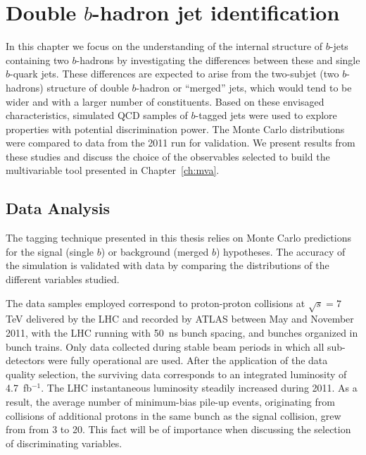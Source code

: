 \chapter{Double $b$-hadron jet identification}\label{ch:kinematic}

In this chapter we focus on the understanding of the internal structure of $b$-jets containing two $b$-hadrons by investigating the differences between these and single $b$-quark jets.  These differences %
are expected to arise from the two-subjet (two $b$-hadrons) structure of double $b$-hadron or ``merged'' jets, which would tend to be wider and with a larger number of constituents. 
Based on these envisaged characteristics, simulated QCD samples of $b$-tagged jets were used to explore properties with potential discrimination power.  The Monte Carlo distributions were  compared to data from the 2011 run for validation.
We present results from these studies and discuss the choice of the observables selected to build the multivariable tool presented in Chapter~\ref{ch:mva}.


\section{Data Analysis}\label{sec:analysis}


The tagging technique presented in this thesis relies on Monte Carlo predictions for the signal (single $b$) or background (merged $b$) hypotheses. The accuracy of the simulation is validated with data by comparing the distributions of the different variables studied.

The data samples employed correspond to proton-proton collisions at $\sqrt{s}=7$ TeV delivered by the LHC and recorded by ATLAS between May and November 2011, with the LHC running with 50~ns bunch spacing, and bunches organized in bunch trains. Only data collected during stable beam periods in which all sub-detectors were fully operational are used. After the application of the data quality selection, the  surviving data corresponds to an integrated luminosity of 4.7~fb$^{-1}$. The LHC instantaneous luminosity steadily increased during 2011. As a result, the average number of minimum-bias pile-up events, originating from collisions of additional protons in the same bunch as the signal collision, grew from from 3 to 20. This fact will be of importance when discussing the selection of discriminating variables.  

